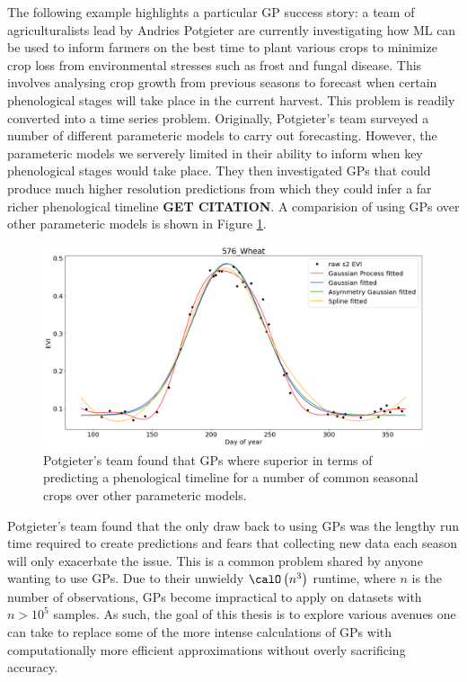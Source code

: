 The following example highlights a particular GP success story: a team of agriculturalists lead by Andries Potgieter are currently investigating how ML can be used to inform farmers on the best time to plant various crops to minimize crop loss from environmental stresses such as frost and fungal disease. This involves analysing crop growth from previous seasons to forecast when certain phenological stages will take place in the current harvest. This problem is readily converted into a time series problem. Originally, Potgieter's team surveyed a number of different parameteric models to carry out forecasting. However, the parameteric models we serverely limited in their ability to inform when key phenological stages would take place. They then investigated GPs that could produce much higher resolution predictions from which they could infer a far richer phenological timeline {\bf GET CITATION}. A comparision of using GPs over other parameteric models is shown in Figure \ref{fig: GP_motivate_wheat}.
\begin{figure}[h]
    \centering
    \includegraphics[scale=0.3]{img/yan_wheat_GPR_plot.png}
    \caption{Potgieter's team found that GPs where superior in terms of predicting a phenological timeline for a number of common seasonal crops over other parameteric models.}
    \label{fig: GP_motivate_wheat}
\end{figure}
Potgieter's team found that the only draw back to using GPs was the lengthy run time required to create predictions and fears that collecting new data each season will only exacerbate the issue. This is a common problem shared by anyone wanting to use GPs. Due to their unwieldy $\calO \left( n^3 \right)$ runtime, where $n$ is the number of observations, GPs become impractical to apply on datasets with $n > 10^5$ samples. As such, the goal of this thesis is to explore various avenues one can take to replace some of the more intense calculations of GPs with computationally more efficient approximations without overly sacrificing accuracy.

